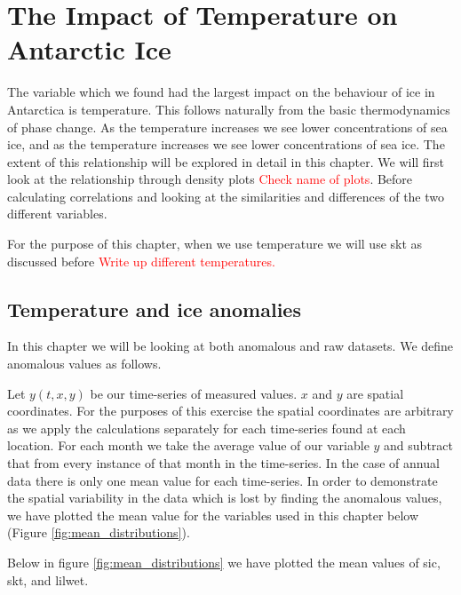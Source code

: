 \documentclass[../main.tex]{subfiles}
\begin{document}
\chapter[Temperature and Ice]{The Impact of Temperature on Antarctic Ice}
\label{chap:temp_and_ice}

The variable which we found had the largest impact on the behaviour of ice in Antarctica is temperature. This follows naturally from the basic thermodynamics of phase change. As the temperature increases we see lower concentrations of sea ice, and as the temperature increases we see lower concentrations of sea ice. The extent of this relationship will be explored in detail in this chapter. We will first look at the relationship through density plots \textcolor{red}{Check name of plots}. Before calculating correlations and looking at the similarities and differences of the two different variables.

For the purpose of this chapter, when we use temperature we will use \gls{skt} as discussed before \textcolor{red}{Write up different temperatures.}

\section{Temperature and ice anomalies}
In this chapter we will be looking at both anomalous and raw datasets. We define anomalous values as follows.

Let $y(t,x,y)$ be our time-series of measured values. $x$ and $y$ are spatial coordinates. For the purposes of this exercise the spatial coordinates are arbitrary as we apply the calculations separately for each time-series found at each location. For each month we take the average value of our variable $y$ and subtract that from every instance of that month in the time-series. In the case of annual data there is only one mean value for each time-series. In order to demonstrate the spatial variability in the data which is lost by finding the anomalous values, we have plotted the mean value for the variables used in this chapter below (Figure \ref{fig:mean_distributions}).

Below in figure \ref{fig:mean_distributions} we have plotted the mean values of \gls{sic}, \gls{skt}, and \gls{lilwet}.
\end{document}
